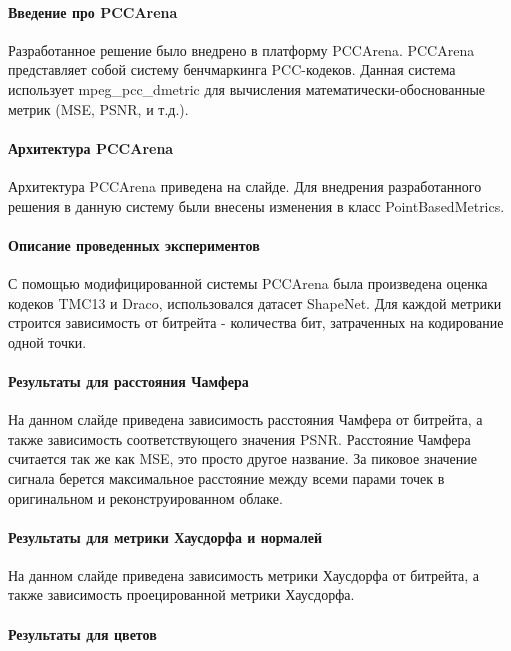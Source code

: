 \documentclass[a4paper,12pt]{extreport}
\begin{document}
\paragraph{Введение про PCCArena}

Разработанное решение было внедрено в платформу PCCArena. PCCArena представляет
собой систему бенчмаркинга PCC-кодеков. Данная система использует
mpeg\_pcc\_dmetric для вычисления математически-обоснованные метрик (MSE, PSNR,
и т.д.).

\paragraph{Архитектура PCCArena}

Архитектура PCCArena приведена на слайде. Для внедрения разработанного решения в
данную систему были внесены изменения в класс PointBasedMetrics.

\paragraph{Описание проведенных экспериментов}

С помощью модифицированной системы PCCArena была произведена оценка кодеков
TMC13 и Draco, использовался датасет ShapeNet. Для каждой метрики строится
зависимость от битрейта - количества бит, затраченных на кодирование одной
точки.

\paragraph{Результаты для расстояния Чамфера}

На данном слайде приведена зависимость расстояния Чамфера от битрейта, а также
зависимость соответствующего значения PSNR. Расстояние Чамфера считается так же
как MSE, это просто другое название. За пиковое значение сигнала берется
максимальное расстояние между всеми парами точек в оригинальном и
реконструированном облаке.

\paragraph{Результаты для метрики Хаусдорфа и нормалей}

На данном слайде приведена зависимость метрики Хаусдорфа от битрейта, а также
зависимость проецированной метрики Хаусдорфа.

\paragraph{Результаты для цветов}
\end{document}
